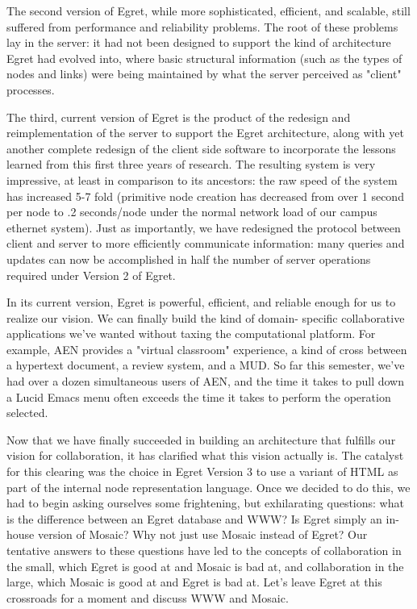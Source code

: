 The second version of Egret, while more sophisticated, efficient, and
scalable, still suffered from performance and reliability problems.  The
root of these problems lay in the server: it had not been designed to
support the kind of architecture Egret had evolved into, where basic
structural information (such as the types of nodes and links) were being
maintained by what the server perceived as "client" processes.

The third, current version of Egret is the product of the redesign and
reimplementation of the server to support the Egret architecture, along
with yet another complete redesign of the client side software to
incorporate the lessons learned from this first three years of research.
The resulting system is very impressive, at least in comparison to its
ancestors: the raw speed of the system has increased 5-7 fold (primitive
node creation has decreased from over 1 second per node to .2 seconds/node
under the normal network load of our campus ethernet system).  Just as
importantly, we have redesigned the protocol between client and server to
more efficiently communicate information: many queries and updates can now
be accomplished in half the number of server operations required under
Version 2 of Egret.

In its current version, Egret is powerful, efficient, and reliable enough
for us to realize our vision.  We can finally build the kind of domain-
specific collaborative applications we've wanted without taxing the
computational platform.  For example, AEN provides a "virtual classroom"
experience, a kind of cross between a hypertext document, a review system,
and a MUD.  So far this semester, we've had over a dozen simultaneous users
of AEN, and the time it takes to pull down a Lucid Emacs menu often exceeds
the time it takes to perform the operation selected.

Now that we have finally succeeded in building an architecture that
fulfills our vision for collaboration, it has clarified what this vision
actually is.  The catalyst for this clearing was the choice in Egret
Version 3 to use a variant of HTML as part of the internal node
representation language.  Once we decided to do this, we had to begin
asking ourselves some frightening, but exhilarating questions: what is the
difference between an Egret database and WWW?  Is Egret simply an in-house
version of Mosaic?  Why not just use Mosaic instead of Egret?  Our
tentative answers to these questions have led to the concepts of
collaboration in the small, which Egret is good at and Mosaic is bad at,
and collaboration in the large, which Mosaic is good at and Egret is bad
at.  Let's leave Egret at this crossroads for a moment and discuss WWW and
Mosaic.





 
